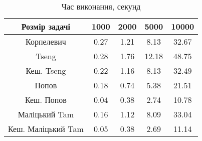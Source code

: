 \begin{table}[H]
	\centering
	\begin{tabular}{|c||c|c|c|c|}\hline
		Розмір задачі & 1000 & 2000 & 5000 & 10000 \\ \hline \hline
		Корпелевич & 0.27 & 1.21 & 8.13 & 32.67 \\ \hline
		Tseng & 0.28 & 1.76 & 12.18 & 48.75 \\ \hline
		Кеш. Tseng & 0.22 & 1.16 & 8.13 & 32.49 \\ \hline
		Попов & 0.18 & 0.74 & 5.38 & 21.51 \\ \hline
		Кеш. Попов & 0.04 & 0.38 & 2.74 & 10.78 \\ \hline
		Маліцький Tam & 0.16 & 1.12 & 8.09 & 33.04 \\ \hline
		Кеш. Маліцький Tam & 0.05 & 0.38 & 2.69 & 11.14 \\ \hline
	\end{tabular}
	\caption{Час виконання, секунд}
\end{table}

